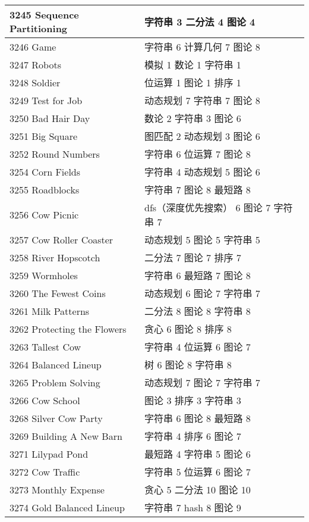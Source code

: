 \begin{longtable}{| p{} | p{} |}
 3245 Sequence Partitioning  & 字符串 3 二分法 4 图论 4 \\ \hline
 3246 Game  & 字符串 6 计算几何 7 图论 8 \\ \hline
 3247 Robots  & 模拟 1 数论 1 字符串 1 \\ \hline
 3248 Soldier  & 位运算 1 图论 1 排序 1 \\ \hline
 3249 Test for Job  & 动态规划 7 字符串 7 图论 8 \\ \hline
 3250 Bad Hair Day  & 数论 2 字符串 3 图论 6 \\ \hline
 3251 Big Square  & 图匹配 2 动态规划 3 图论 6 \\ \hline
 3252 Round Numbers  & 字符串 6 位运算 7 图论 8 \\ \hline
 3254 Corn Fields  & 字符串 4 动态规划 5 图论 6 \\ \hline
 3255 Roadblocks  & 字符串 7 图论 8 最短路 8 \\ \hline
 3256 Cow Picnic  & dfs（深度优先搜索） 6 图论 7 字符串 7 \\ \hline
 3257 Cow Roller Coaster  & 动态规划 5 图论 5 字符串 5 \\ \hline
 3258 River Hopscotch  & 二分法 7 图论 7 排序 7 \\ \hline
 3259 Wormholes  & 字符串 6 最短路 7 图论 8 \\ \hline
 3260 The Fewest Coins  & 动态规划 6 图论 7 字符串 7 \\ \hline
 3261 Milk Patterns  & 二分法 8 图论 8 字符串 8 \\ \hline
 3262 Protecting the Flowers  & 贪心 6 图论 8 排序 8 \\ \hline
 3263 Tallest Cow  & 字符串 4 位运算 6 图论 7 \\ \hline
 3264 Balanced Lineup  & 树 6 图论 8 字符串 8 \\ \hline
 3265 Problem Solving  & 动态规划 7 图论 7 字符串 7 \\ \hline
 3266 Cow School  & 图论 3 排序 3 字符串 3 \\ \hline
 3268 Silver Cow Party  & 字符串 6 图论 8 最短路 8 \\ \hline
 3269 Building A New Barn  & 字符串 4 排序 6 图论 7 \\ \hline
 3271 Lilypad Pond  & 最短路 4 字符串 5 图论 6 \\ \hline
 3272 Cow Traffic  & 字符串 5 位运算 6 图论 7 \\ \hline
 3273 Monthly Expense  & 贪心 5 二分法 10 图论 10 \\ \hline
 3274 Gold Balanced Lineup  & 字符串 7 hash 8 图论 9 \\ \hline

\end{longtable}

